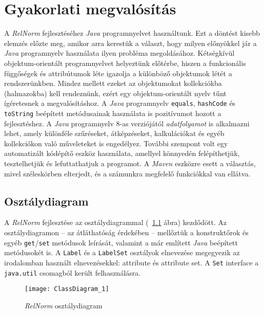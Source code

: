 \chapter{Gyakorlati megvalósítás}
\label{ch:gyakorlat}

A \textit{RelNorm} fejlesztéséhez \textit{Java} programnyelvet használtunk. Ezt a döntést kisebb elemzés előzte meg, amikor arra kerestük a választ, hogy milyen előnyökkel jár a \textit{Java} programnyelv használata ilyen probléma megoldásához. Kétségkívül objektum-orientált programnyelvet helyeztünk előtérbe, hiszen a funkcionális függőségek és attribútumok léte igazolja a különböző objektumok létét a rendszerünkben. Mindez mellett ezeket az objektumokat kollekciókba (halmazokba) kell rendeznünk, ezért egy objektum-orientált nyelv tűnt ígéretesnek a megvalósításhoz. A \textit{Java} programnyelv \lstinline{equals}, \lstinline{hashCode} és \lstinline{toString} beépített metódusainak használata is pozitívumot hozott a fejlesztéshez. A \textit{Java} programnyelv 8-as verziójától \textit{adatfolyamot}  is alkalmazni lehet, amely különféle szűréseket, átképzéseket, kalkulációkat és egyéb kollekciókon való műveleteket is engedélyez.
További szempont volt egy automatizált kódépítő eszköz használata, amellyel könnyedén felépíthetjük, tesztelhetjük és lefuttathatjuk a programot. A \textit{Maven} eszközre esett a választás, mivel széleskörben elterjedt, és a számunkra megfelelő funkciókkal van ellátva.

\section{Osztálydiagram}

A \textit{RelNorm} fejlesztése az osztálydiagrammal (~\ref{fig:class} ábra) kezdődött. Az osztálydiagramon -- az átláthatóság érdekében -- mellőztük a konstruktőrok és egyéb \lstinline{get}/\lstinline{set} metódusok leírását, valamint a már említett \textit{Java} beépített metódusokét is. A \lstinline{Label} és a \lstinline{LabelSet} osztályok elnevezése megegyezik az irodalomban használt elnevezésekkel: attribute és attribute set. A \lstinline{Set} interface a \lstinline{java.util} csomagból került felhasználásra.

\begin{figure}
    \centering
    \texttt{[image: ClassDiagram\_1]}
    \caption{\textit{RelNorm} osztálydiagram}
    \label{fig:class}
\end{figure}
 
